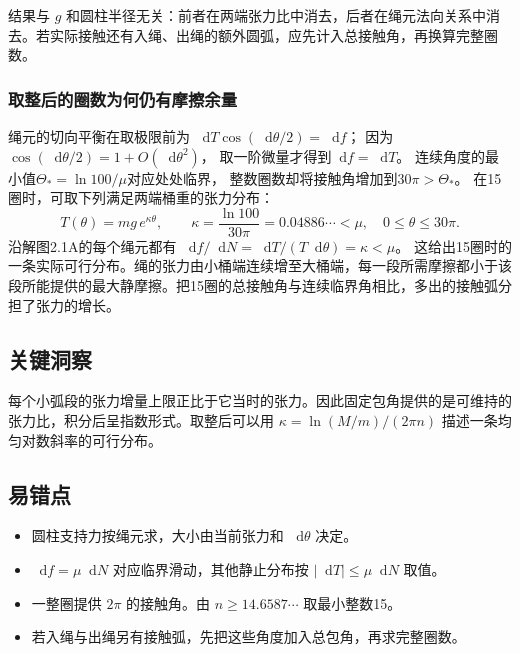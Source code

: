 \documentclass[UTF8,fontset=fandol,a4paper,11pt]{ctexart}
\newcommand{\dd}{\mathop{}\!\mathrm{d}}
\begin{document}
结果与 $g$ 和圆柱半径无关：前者在两端张力比中消去，后者在绳元法向关系中消去。若实际接触还有入绳、出绳的额外圆弧，应先计入总接触角，再换算完整圈数。
\subsubsection*{取整后的圈数为何仍有摩擦余量}
绳元的切向平衡在取极限前为
$\dd T\cos(\dd\theta/2)=\dd f$；
因为$\cos(\dd\theta/2)=1+O(\dd\theta^2)$，
取一阶微量才得到$\dd f=\dd T$。
连续角度的最小值$\Theta_*=\ln100/\mu$对应处处临界，
整数圈数却将接触角增加到$30\pi>\Theta_*$。
在15圈时，可取下列满足两端桶重的张力分布：
\[
T(\theta)=mg\,e^{\kappa\theta},\qquad
\kappa=\frac{\ln100}{30\pi}=0.04886\cdots<\mu,
\quad0\leq\theta\leq30\pi.
\]
沿解图2.1A的每个绳元都有
$\dd f/\dd N=\dd T/(T\dd\theta)=\kappa<\mu$。
这给出15圈时的一条实际可行分布。绳的张力由小桶端连续增至大桶端，每一段所需摩擦都小于该段所能提供的最大静摩擦。把15圈的总接触角与连续临界角相比，多出的接触弧分担了张力的增长。




\subsection*{关键洞察}

每个小弧段的张力增量上限正比于它当时的张力。因此固定包角提供的是可维持的张力比，积分后呈指数形式。取整后可以用 $\kappa=\ln(M/m)/(2\pi n)$ 描述一条均匀对数斜率的可行分布。



\subsection*{易错点}

\begin{itemize}
\item 圆柱支持力按绳元求，大小由当前张力和 $\dd\theta$ 决定。
\item $\dd f=\mu\dd N$ 对应临界滑动，其他静止分布按 $|\dd T|\leq\mu\dd N$ 取值。
\item 一整圈提供 $2\pi$ 的接触角。由 $n\geq14.6587\cdots$ 取最小整数15。
\item 若入绳与出绳另有接触弧，先把这些角度加入总包角，再求完整圈数。
\end{itemize}

\end{document}
